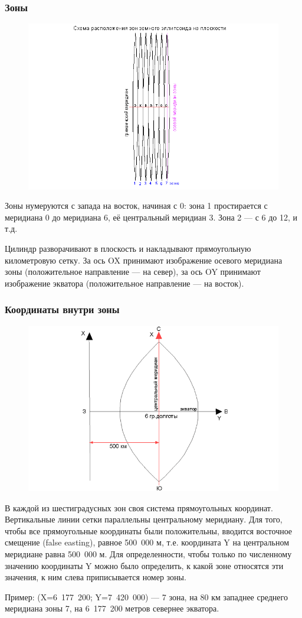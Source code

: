 \begin{frame}
    \frametitle{Зоны}
    \begin{figure}[!ht]
        \begin{center}
            \includegraphics[width=0.6\columnwidth]{./coordinates/img/zonesgk_l.png}
        \end{center}
    \end{figure}
     Зоны нумеруются с запада на восток, начиная с 0: зона 1 простирается с меридиана 0 до меридиана 6, её центральный меридиан 3. Зона 2 --- с 6 до 12, и т.д.

     Цилиндр разворачивают в плоскость и накладывают прямоугольную километровую сетку. За ось OX принимают изображение осевого меридиана зоны (положительное направление --- на север), за ось OY принимают изображение экватора (положительное направление --- на восток).
\end{frame}

\begin{frame}
    \frametitle{Координаты внутри зоны}
    \begin{figure}[!ht]
        \begin{center}
            \includegraphics[width=0.35\columnwidth]{./coordinates/img/gauss_kruger2.png}
        \end{center}
    \end{figure}
    В каждой из шестиградусных зон своя система прямоугольных координат. Вертикальные линии сетки параллельны центральному меридиану. Для того, чтобы все прямоугольные координаты были положительны, вводится восточное смещение (false easting), равное 500~000 м, т.е. координата Y на центральном меридиане равна 500~000 м. Для определенности, чтобы только по численному значению координаты Y можно было определить, к какой зоне относятся эти значения, к ним слева приписывается номер зоны.

    Пример: (X=6~177~200; Y=7~420~000) --- 7 зона, на 80 км западнее среднего меридиана зоны 7, на 6~177~200 метров севернее экватора.

\end{frame}

